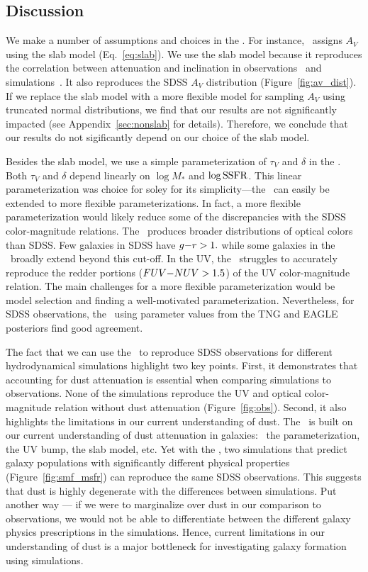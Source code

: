 \subsection{Discussion}  
We make a number of assumptions and choices in the \eda. For instance, 
\eda~assigns $A_V$ using the slab model (Eq.~\ref{eq:slab}). We use the slab
model because it reproduces the correlation between attenuation and inclination 
in observations~\citep{conroy2010b, wild2011, battisti2017, salim2020} and
simulations~\citep[\eg][]{chevallard2013, narayanan2018, trayford2020}.
It also reproduces the SDSS $A_V$ distribution (Figure~\ref{fig:av_dist}). If
we replace the slab model with a more flexible model for sampling $A_V$ using
truncated normal distributions, we find that our results are not significantly
impacted (see Appendix~\ref{sec:nonslab} for details). Therefore, we conclude
that our results do not sigificantly depend on our choice of the slab model. 

Besides the slab model, we use a simple parameterization of $\tau_V$ and
$\delta$ in the \eda. Both $\tau_V$ and $\delta$ depend linearly on $\log M_*$ 
and $\log {\rm SSFR}$. This linear parameterization was choice for soley for
its simplicity---the \eda~can easily be extended to more flexible
parameterizations. In fact, a more flexible parameterization would likely reduce 
some of the discrepancies with the SDSS color-magnitude relations. The
\eda~produces broader distributions of optical colors than SDSS. Few galaxies
in SDSS have $g{-}r > 1.$ while some galaxies in the \eda~broadly extend beyond
this cut-off. In the UV, the \eda~struggles to accurately reproduce the redder
portions ($FUV{-}NUV > 1.5$) of the UV color-magnitude relation. The main
challenges for a more flexible parameterization would be model selection and
finding a well-motivated parameterization. Nevertheless, for SDSS 
observations, the \eda~using parameter values from the TNG and EAGLE
posteriors find good agreement.

The fact that we can use the \eda~to reproduce SDSS observations for different
hydrodynamical simulations highlight two key points. First, it demonstrates 
that accounting for dust attenuation is essential when comparing simulations to
observations. None of the simulations reproduce the UV and optical
color-magnitude relation without dust attenuation (Figure~\ref{fig:obs}). 
Second, it also highlights the limitations in our current understanding of dust. 
The \eda~is built on our current understanding of dust attenuation in galaxies:
\eg~the \citealt{noll2009} parameterization, the UV bump, the slab model, etc.
Yet with the \eda, two simulations that predict galaxy populations with
significantly different physical properties (Figure~\ref{fig:smf_msfr}) can
reproduce the same SDSS observations. This suggests that dust is highly
degenerate with the differences between simulations. Put another way --- if we 
were to marginalize over dust in our comparison to observations, we would not
be able to differentiate between the different galaxy physics prescriptions in
the simulations. Hence, current limitations in our understanding of dust is 
a major bottleneck for investigating galaxy formation using simulations.


